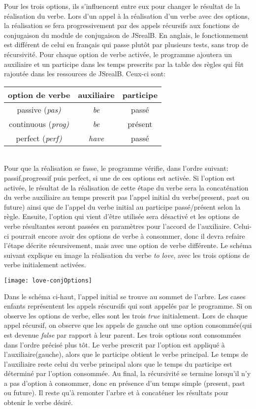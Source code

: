 \documentclass[11pt]{article} %
\begin{document}
Pour les trois options, ils s'influencent entre eux pour changer le
résultat de la réalisation du verbe. Lors d'un appel à la réalisation
d'un verbe avec des options, la réalisation se fera progressivement
par des appels récursifs aux fonctions de conjugaison du module de
conjugaison de JSrealB. En anglais, le fonctionnement est différent
de celui en français qui passe plutôt par plusieurs tests, sans trop
de récursivité. Pour chaque option de verbe activée, le programme ajoutera
un auxiliaire et un participe dans les temps prescrits par la table
des règles qui fût rajoutée dans les ressources de JSrealB. Ceux-ci
sont: 
\\
\begin{tabular}{|c|c|c|}
\hline 
option de verbe & auxiliaire & participe\tabularnewline
\hline 
\hline 
passive (\emph{pas)} & \emph{be} & passé\tabularnewline
\hline 
continuous (\emph{prog)} & \emph{be} & présent\tabularnewline
\hline 
perfect (\emph{perf)} & \emph{have} & passé\tabularnewline
\hline 
\end{tabular}
\\
Pour que la réalisation se fasse, le programme vérifie, dans l'ordre
suivant: passif,progressif puis perfect, si une de ces options est
activée. Si l'option est activée, le résultat de la réalisation de
cette étape du verbe sera la concaténation du verbe auxiliaire au
temps prescrit pas l'appel initial du verbe(present, past ou future)
ainsi que de l'appel du verbe initial au participe passé/présent selon
la règle. Ensuite, l'option qui vient d'être utilisée sera désactivé et les options
de verbe résultantes seront passées en paramètres pour l'accord de
l'auxiliaire. Celui-ci pourrait encore avoir des options de verbe
à consommer, donc il devra refaire l'étape décrite récursivement,
mais avec une option de verbe différente. Le schéma suivant explique
en image la réalisation du verbe \emph{to love}, avec les trois options
de verbe initialement activées.

\texttt{[image: love-conjOptions]}

\small{Dans le schéma ci-haut, l'appel initial se trouve au sommet de l'arbre. Les 
cases enfants représentent les appels réscursifs qui sont appelés par le programme.
Si on observe les options de verbe, elles sont les trois \emph{true} initialement. Lors de
chaque appel récursif, on observe que les appels de gauche ont une option consommée(qui est devenue
\emph{false} par rapport à leur parent. Les trois options sont consommées dans l'ordre précisé plus tôt. 
Le verbe prescrit par l'option est appliqué à l'auxiliaire(gauche), alors que le participe obtient le verbe 
principal. Le temps de l'auxiliaire reste celui du verbe principal alors que le temps du participe est déterminé
 par l'option consommée. Au final, la récursivité se termine lorsqu'il n'y a pas d'option à consommer, donc en
présence d'un temps simple (present, past ou future). Il reste qu'à remonter l'arbre et à concaténer les résultats
pour obtenir le verbe désiré.}
\end{document}
